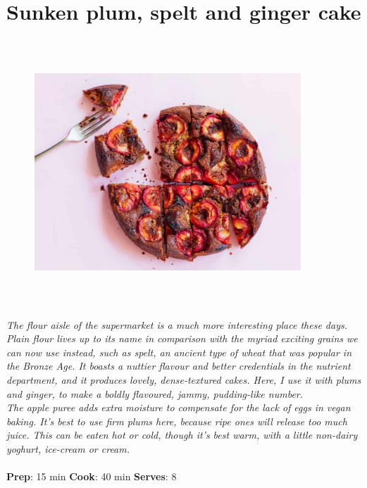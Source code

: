 \documentclass{book}
\begin{document}
\section{Sunken plum, spelt and ginger cake}
\begin{figure}
\centering\includegraphics[width=10cm,height=10cm,keepaspectratio]{Recipe_Pictures/Sunken_plum,_spelt_and_ginger_cake.png}
\end{figure}
\emph{The flour aisle of the supermarket is a much more interesting place these days. Plain flour lives up to its name in comparison with the myriad exciting grains we can now use instead, such as spelt, an ancient type of wheat that was popular in the Bronze Age. It boasts a nuttier flavour and better credentials in the nutrient department, and it produces lovely, dense-textured cakes. Here, I use it with plums and ginger, to make a boldly flavoured, jammy, pudding-like number.\\ 
The apple puree adds extra moisture to compensate for the lack of eggs in vegan baking. It’s best to use firm plums here, because ripe ones will release too much juice. This can be eaten hot or cold, though it’s best warm, with a little non-dairy yoghurt, ice-cream or cream.}\\\\ 
\textbf{Prep}: 15 min
\textbf{Cook}: 40 min
\textbf{Serves}: 8
\end{document}
